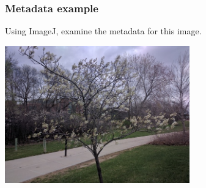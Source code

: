 \documentclass{beamer}
\begin{document}
\begin{frame}
	\frametitle{Metadata example}

	Using ImageJ, examine the metadata for this image.

	\begin{center}

		\includegraphics[width=0.6\textwidth]{../../fig/01-metadata-before.jpg}

	\end{center}

\end{frame}
\end{document}
